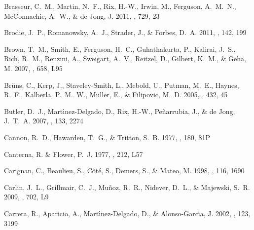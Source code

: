 \documentclass[manuscript]{aastex}
\begin{document}
\begin{thebibliography}{381}
{Brasseur}, C.~M., {Martin}, N.~F., {Rix}, H.-W., {Irwin}, M., {Ferguson},
  A.~M.~N., {McConnachie}, A.~W., \& {de Jong}, J. 2011{}, \apj,
  729, 23

{Brodie}, J.~P., {Romanowsky}, A.~J., {Strader}, J., \& {Forbes}, D.~A. 2011,
  \aj, 142, 199

{Brown}, T.~M., {Smith}, E., {Ferguson}, H.~C., {Guhathakurta}, P., {Kalirai},
  J.~S., {Rich}, R.~M., {Renzini}, A., {Sweigart}, A.~V., {Reitzel}, D.,
  {Gilbert}, K.~M., \& {Geha}, M. 2007, \apjl, 658, L95

{Br{\"u}ns}, C., {Kerp}, J., {Staveley-Smith}, L., {Mebold}, U., {Putman},
  M.~E., {Haynes}, R.~F., {Kalberla}, P.~M.~W., {Muller}, E., \& {Filipovic},
  M.~D. 2005, \aap, 432, 45

{Butler}, D.~J., {Mart{\'{\i}}nez-Delgado}, D., {Rix}, H.-W., {Pe{\~n}arrubia},
  J., \& {de Jong}, J.~T.~A. 2007, \aj, 133, 2274

{Cannon}, R.~D., {Hawarden}, T.~G., \& {Tritton}, S.~B. 1977, \mnras, 180, 81P

{Canterna}, R. \& {Flower}, P.~J. 1977, \apjl, 212, L57

{Carignan}, C., {Beaulieu}, S., {C{\^o}t{\'e}}, S., {Demers}, S., \& {Mateo},
  M. 1998, \aj, 116, 1690

{Carlin}, J.~L., {Grillmair}, C.~J., {Mu{\~n}oz}, R.~R., {Nidever}, D.~L., \&
  {Majewski}, S.~R. 2009, \apjl, 702, L9

{Carrera}, R., {Aparicio}, A., {Mart{\'{\i}}nez-Delgado}, D., \&
  {Alonso-Garc{\'{\i}}a}, J. 2002, \aj, 123, 3199


\end{thebibliography}
\end{document}

